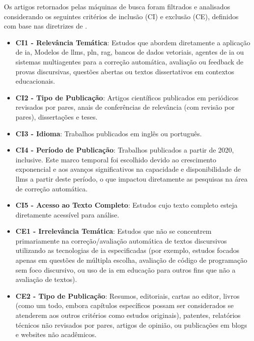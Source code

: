 Os artigos retornados pelas máquinas de busca foram filtrados e analisados considerando os seguintes critérios de inclusão (CI) e exclusão (CE), definidos com base nas diretrizes de .

\begin{itemize}
    \item \textbf{CI1 - Relevância Temática}: Estudos que abordem diretamente a aplicação de \gls{ia}, Modelos de \gls{llm}s, \gls{pln}, \gls{rag}, bancos de dados vetoriais, agentes de \gls{ia} ou sistemas multiagentes para a correção automática, avaliação ou feedback de provas discursivas, questões abertas ou textos dissertativos em contextos educacionais.

    \item \textbf{CI2 - Tipo de Publicação}: Artigos científicos publicados em periódicos revisados por pares, anais de conferências de relevância (com revisão por pares), dissertações e teses.

    \item \textbf{CI3 - Idioma}: Trabalhos publicados em inglês ou português.

    \item \textbf{CI4 - Período de Publicação}: Trabalhos publicados a partir de 2020, inclusive. Este marco temporal foi escolhido devido ao crescimento exponencial e aos avanços significativos na capacidade e disponibilidade de \gls{llm}s a partir deste período, o que impactou diretamente as pesquisas na área de correção automática.

    \item \textbf{CI5 - Acesso ao Texto Completo}: Estudos cujo texto completo esteja diretamente acessível para análise.

    \item \textbf{CE1 - Irrelevância Temática}: Estudos que não se concentrem primariamente na correção/avaliação automática de textos discursivos utilizando as tecnologias de \gls{ia} especificadas (por exemplo, estudos focados apenas em questões de múltipla escolha, avaliação de código de programação sem foco discursivo, ou uso de \gls{ia} em educação para outros fins que não a avaliação de textos).

    \item \textbf{CE2 - Tipo de Publicação}: Resumos, editoriais, cartas ao editor, livros (como um todo, embora capítulos específicos possam ser considerados se atenderem aos outros critérios como estudos originais), patentes, relatórios técnicos não revisados por pares, artigos de opinião, ou publicações em blogs e websites não acadêmicos.


\end{itemize}
